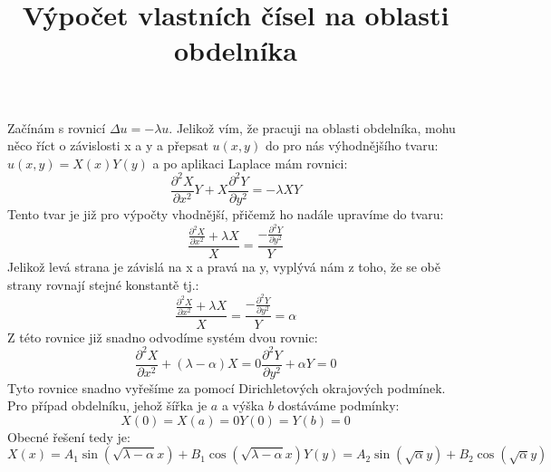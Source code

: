\documentclass{article}
\title{Výpočet vlastních čísel na oblasti obdelníka}
\date{}
\begin{document}
\maketitle
Začínám s rovnicí $\Delta u=-\lambda u$. Jelikož vím, že pracuji na oblasti obdelníka, mohu něco říct o závislosti x a y a přepsat $u(x,y)$ do pro nás výhodnějšího tvaru: $u(x,y)=X(x) Y(y)$ a po aplikaci Laplace mám rovnici:
\begin{equation}
   \frac{\partial^2 X}{\partial x^2} Y
      + X \frac{\partial^2 Y}{\partial y^2}=-\lambda X Y
 \end{equation}
Tento tvar je již pro výpočty vhodnější, přičemž ho nadále upravíme do tvaru:
\begin{equation}
\frac {\frac{\partial^2 X}{\partial x^2}+\lambda X}{X}=\frac{-\frac{\partial^2 Y}{\partial y^2}}{Y}
\end{equation}
Jelikož levá strana je závislá na x a pravá na y, vyplývá nám z toho, že se obě strany rovnají stejné konstantě tj.:
 \begin{equation}
\frac {\frac{\partial^2 X}{\partial x^2}+\lambda X}{X}=\frac{-\frac{\partial^2 Y}{\partial y^2}}{Y}=\alpha
\end{equation}
Z této rovnice již snadno odvodíme systém dvou rovnic:
\begin{subequations}
\begin{equation}
\frac{\partial^2 X}{\partial x^2}+(\lambda-\alpha)X=0
\end{equation}
\begin{equation}
\frac{\partial^2 Y}{\partial y^2}+\alpha Y=0
\end{equation}
\end{subequations}
Tyto rovnice snadno vyřešíme za pomocí Dirichletových okrajových podmínek. Pro případ obdelníku, jehož šířka je $a$ a výška $b$ dostáváme podmínky:
\begin{subequations}
\begin{equation}
X(0)=X(a)=0
\end{equation}
\begin{equation}
Y(0)=Y(b)=0
\end{equation}
\end{subequations}
Obecné řešení tedy je:
\begin{subequations}
\begin{equation}
X(x)=A_1 \sin{(\sqrt{\lambda-\alpha}x)}+B_1 \cos{(\sqrt{\lambda-\alpha}x)}
\end{equation}
\begin{equation}
Y(y)=A_2 \sin{(\sqrt{\alpha}y)}+B_2 \cos{(\sqrt{\alpha}y)}
\end{equation}
\end{subequations}
\end{document}
